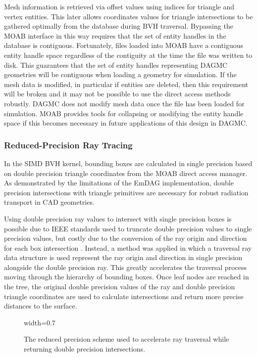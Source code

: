 Mesh information is retrieved via offset values using indices for triangle and
vertex entities. This later allows coordinates values for triangle intersections
to be gathered optimally from the database during BVH traversal. Bypassing the
MOAB interface in this way requires that the set of entity handles in the
database is contiguous. Fortunately, files loaded into MOAB have a contiguous
entity handle space regardless of the contiguity at the time the file was
written to disk. This guarantees that the set of entity handles representing
DAGMC geometries will be contiguous when loading a geometry for simulation. If
the mesh data is modified, in particular if entities are deleted, then this
requirement will be broken and it may not be possible to use the direct access
methods robustly. DAGMC does not modify mesh data once the file has been loaded
for simulation. MOAB provides tools for collapsing or modifying the entity
handle space if this becomes necessary in future applications of this design in DAGMC.

\subsubsection{Reduced-Precision Ray Tracing}\label{subsubsec:reduced_precision}

In the SIMD BVH kernel, bounding boxes are calculated in single precision based
on double precision triangle coordinates from the MOAB direct access manager. As
demonstrated by the limitations of the EmDAG implementation, double precision
intersections with triangle primitives are necessary for robust radiation
transport in CAD geometries.

Using double precision ray values to intersect with single precision boxes is
possible due to IEEE standards used to truncate double precision values to
single precision values, but costly due to the conversion of the ray origin and
direction for each box intersection \cite{IEEE_STD_2008}. Instead, a method was
applied in which a traversal ray data structure is used represent the ray origin
and direction in single precision alongside the double precision ray. This
greatly accelerates the traversal process moving through the hierarchy of
bounding boxes. Once leaf nodes are reached in the tree, the original double
precision values of the ray and double precision triangle coordinates are used
to calculate intersections and return more precise distances to the surface.

\begin{figure}[H]
  \centering
  {width=0.7\textwidth}
  \caption[Depiction of reduced precision ray tracing scheme.]{The reduced
    precision scheme used to accelerate ray traversal while returning double
    precision intersections.}
  \label{fig:reduced_precision_scheme}
\end{figure}

